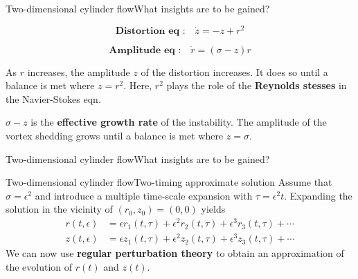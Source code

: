 \documentclass[usenames,dvipsnames,svgnames,10pt,aspectratio=169]{beamer}
\begin{document}
\begin{frame}[t, c]{Two-dimensional cylinder flow}{What insights are to be gained?}
  \begin{minipage}{.48\textwidth}
    \[
    \textbf{Distortion eq :} \quad \dot{z} = -z + r^2
    \]
  \end{minipage}%
  \hfill
  \begin{minipage}{.48\textwidth}
    \[
    \textbf{Amplitude eq :} \quad \dot{r} = \left( \sigma - z \right) r
    \]
  \end{minipage}

  \bigskip

  \begin{minipage}{.48\textwidth}
    As $r$ increases, the amplitude $z$ of the distortion increases.
    It does so until a balance is met where $z = r^2$.
    Here, $r^2$ plays the role of the \alert{\textbf{Reynolds stesses}} in the Navier-Stokes eqn.
  \end{minipage}%
  \hfill
  \begin{minipage}{.48\textwidth}
    $\sigma - z$ is the \alert{\textbf{effective growth rate}} of the instability.
    The amplitude of the vortex shedding grows until a balance is met where $z = \sigma$.
    \vspace{0.5cm}
  \end{minipage}

\end{frame}




\begin{frame}[t, c]{Two-dimensional cylinder flow}{What insights are to be gained?}
  
\end{frame}



\begin{frame}[t, c]{Two-dimensional cylinder flow}{Two-timing approximate solution}
  Assume that $\sigma = \epsilon^2$ and introduce a multiple time-scale expansion with $\tau = \epsilon^2 t$.
  Expanding the solution in the vicinity of $(r_0, z_0) = (0, 0)$ yields
  \[
  \begin{aligned}
    r(t, \epsilon) & = \epsilon r_1(t, \tau) + \epsilon^2 r_2(t, \tau) + \epsilon^3 r_3(t, \tau) + \cdots \\
    z(t, \epsilon) & = \epsilon z_1(t, \tau) + \epsilon^2 z_2(t, \tau) + \epsilon^3 z_3(t, \tau) + \cdots
  \end{aligned}
  \]
  We can now use \alert{\textbf{regular perturbation theory}} to obtain an approximation of the evolution of $r(t)$ and $z(t)$.
\end{frame}
\end{document}
